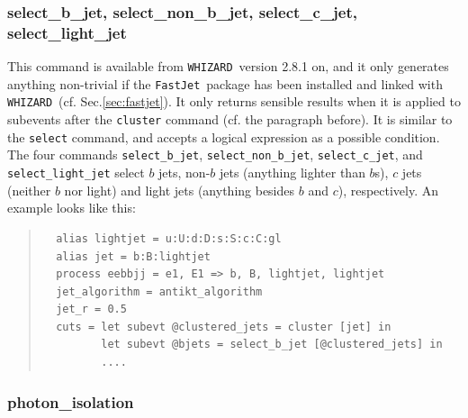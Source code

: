 \documentclass[12pt]{book}
\newcommand{\ttt}[1]{\texttt{#1}}
\newcommand{\whizard}{\ttt{WHIZARD}}
\newcommand{\fastjet}{\ttt{FastJet}}
\begin{document}
\subsubsection{select\_b\_jet, select\_non\_b\_jet, select\_c\_jet,
  select\_light\_jet}

This command is available from \whizard\ version 2.8.1 on, and it only
generates anything non-trivial if the \fastjet\ package has been
installed and linked with \whizard\ (cf. Sec.\ref{sec:fastjet}). It
only returns sensible results when it is applied to subevents after
the \ttt{cluster} command (cf. the paragraph before). It is similar to
the \ttt{select} command, and accepts a logical expression as a
possible condition. The four commands \ttt{select\_b\_jet},
\ttt{select\_non\_b\_jet}, \ttt{select\_c\_jet}, and
\ttt{select\_light\_jet} select $b$ jets, non-$b$ jets
(anything lighter than $b$s), $c$ jets (neither $b$ nor light) and
light jets (anything besides $b$ and $c$), respectively. An example
looks like this:
\begin{quote}
\begin{footnotesize}
\begin{verbatim}
  alias lightjet = u:U:d:D:s:S:c:C:gl
  alias jet = b:B:lightjet
  process eebbjj = e1, E1 => b, B, lightjet, lightjet
  jet_algorithm = antikt_algorithm
  jet_r = 0.5
  cuts = let subevt @clustered_jets = cluster [jet] in
         let subevt @bjets = select_b_jet [@clustered_jets] in
         ....
\end{verbatim}
\end{footnotesize}
\end{quote}

\subsubsection{photon\_isolation}
\end{document}
